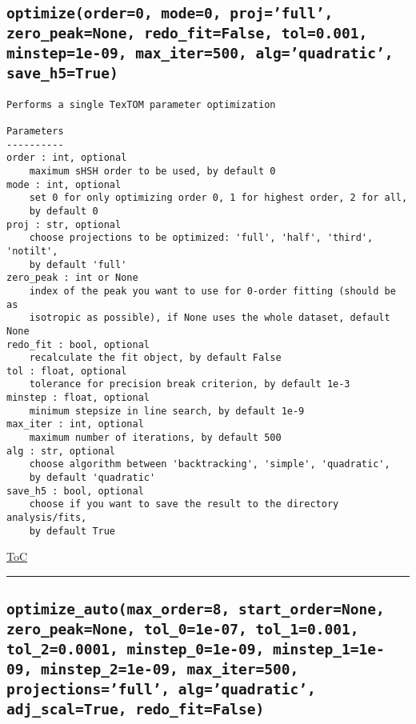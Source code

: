 \documentclass{article}
\begin{document}
\subsection*{\texttt{optimize(order=0, mode=0, proj='full', zero\_peak=None, redo\_fit=False, tol=0.001, minstep=1e-09, max\_iter=500, alg='quadratic', save\_h5=True)}}
\label{fun:optimize}

\begin{lstlisting}[language=docstring]
Performs a single TexTOM parameter optimization

Parameters
----------
order : int, optional
    maximum sHSH order to be used, by default 0
mode : int, optional
    set 0 for only optimizing order 0, 1 for highest order, 2 for all,
    by default 0
proj : str, optional
    choose projections to be optimized: 'full', 'half', 'third', 'notilt', 
    by default 'full'
zero_peak : int or None
    index of the peak you want to use for 0-order fitting (should be as
    isotropic as possible), if None uses the whole dataset, default None
redo_fit : bool, optional
    recalculate the fit object, by default False
tol : float, optional
    tolerance for precision break criterion, by default 1e-3
minstep : float, optional
    minimum stepsize in line search, by default 1e-9
max_iter : int, optional
    maximum number of iterations, by default 500
alg : str, optional
    choose algorithm between 'backtracking', 'simple', 'quadratic', 
    by default 'quadratic'
save_h5 : bool, optional
    choose if you want to save the result to the directory analysis/fits, 
    by default True    
\end{lstlisting}

\begin{flushright}

\hyperref[toc]{ToC}

\end{flushright}



\vspace{5mm}

\hrule

\subsection*{\texttt{optimize\_auto(max\_order=8, start\_order=None, zero\_peak=None, tol\_0=1e-07, tol\_1=0.001, tol\_2=0.0001, minstep\_0=1e-09, minstep\_1=1e-09, minstep\_2=1e-09, max\_iter=500, projections='full', alg='quadratic', adj\_scal=True, redo\_fit=False)}}
\label{fun:optimizeauto}
\end{document}
